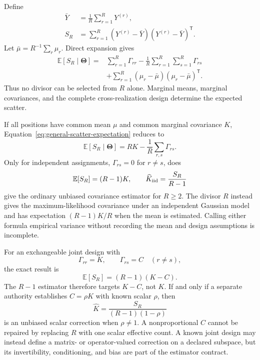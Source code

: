 \documentclass[11pt]{article}
\newcommand{\E}{\mathbb{E}}
\newcommand{\ThetaV}{\boldsymbol{\Theta}}
\begin{document}
Define
\begin{align}
  \bar Y &= \frac1R\sum_{r=1}^R Y^{(r)},
  \label{eq:sample-mean}\\
  S_R &= \sum_{r=1}^R
    (Y^{(r)}-\bar Y)(Y^{(r)}-\bar Y)^{\mathsf T}.
  \label{eq:centered-scatter}
\end{align}
Let $\bar\mu=R^{-1}\sum_r\mu_r$.  Direct expansion gives
\begin{align}
  \E[S_R\mid\ThetaV]
  ={}&\sum_{r=1}^R\Gamma_{rr}
     -\frac1R\sum_{r=1}^R\sum_{s=1}^R\Gamma_{rs}
  \nonumber\\
  &+\sum_{r=1}^R
    (\mu_r-\bar\mu)(\mu_r-\bar\mu)^{\mathsf T}.
  \label{eq:general-scatter-expectation}
\end{align}
Thus no divisor can be selected from $R$ alone.  Marginal means, marginal
covariances, and the complete cross-realization design determine the expected
scatter.

If all positions have common mean $\mu$ and common marginal covariance $K$,
Equation~\eqref{eq:general-scatter-expectation} reduces to
\begin{equation}
  \E[S_R\mid\ThetaV]
  =RK-\frac1R\sum_{r,s}\Gamma_{rs}.
  \label{eq:common-marginal-scatter}
\end{equation}
Only for independent assignments, $\Gamma_{rs}=0$ for $r\ne s$, does
\begin{equation}
  \E[S_R]=(R-1)K,
  \qquad
  \widehat K_{\rm iid}=\frac{S_R}{R-1}
  \label{eq:bessel-case}
\end{equation}
give the ordinary unbiased covariance estimator for $R\ge2$.  The divisor
$R$ instead gives the maximum-likelihood covariance under an independent
Gaussian model and has expectation $(R-1)K/R$ when the mean is estimated.
Calling either formula empirical variance without recording the mean and
design assumptions is incomplete.

For an exchangeable joint design with
\begin{equation}
  \Gamma_{rr}=K,
  \qquad
  \Gamma_{rs}=C\quad(r\ne s),
  \label{eq:exchangeable-design}
\end{equation}
the exact result is
\begin{equation}
  \E[S_R]=(R-1)(K-C).
  \label{eq:exchangeable-scatter}
\end{equation}
The $R-1$ estimator therefore targets $K-C$, not $K$.  If and only if a
separate authority establishes $C=\rho K$ with known scalar $\rho$, then
\begin{equation}
  \widehat K
  =\frac{S_R}{(R-1)(1-\rho)}
  \label{eq:scalar-correlation-correction}
\end{equation}
is an unbiased scalar correction when $\rho\ne1$.  A nonproportional $C$
cannot be repaired by replacing $R$ with one scalar effective count.  A known
joint design may instead define a matrix- or operator-valued correction on a
declared subspace, but its invertibility, conditioning, and bias are part of
the estimator contract.
\end{document}
